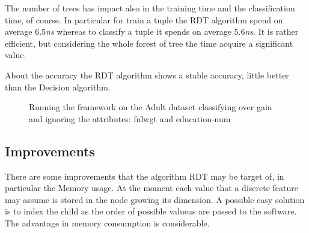 \documentclass{acm_proc_article-sp-sigmod07}
\begin{document}
The number of trees has impact also in the training time and the
classification time, of course. In particular for train a tuple the RDT
algorithm spend on average 6.5\emph{ns} whereas to classify a tuple it
spends on average 5.6\emph{ns}. It is rather efficient, but considering
the whole forest of tree the time acquire a significant value.

About the accuracy the RDT algorithm shows a stable accuracy, little
better than the Decision algorithm.

\begin{figure*}
\label{fig:standard}
\centering
{}
\caption{Running the framework on the Adult dataset classifying over gain
and ignoring the attributes: fnlwgt and education-num}
\end{figure*}

\subsection{Improvements}
There are some improvements that the algorithm RDT may be target of, in
particular the Memory usage. At the moment each value that a discrete
feature may assume is stored in the node growing its dimension. A
possible easy solution is to index the child as the order of possible
valueas are passed to the software. The advantage in memory consumption is
considerable.



\end{document}
